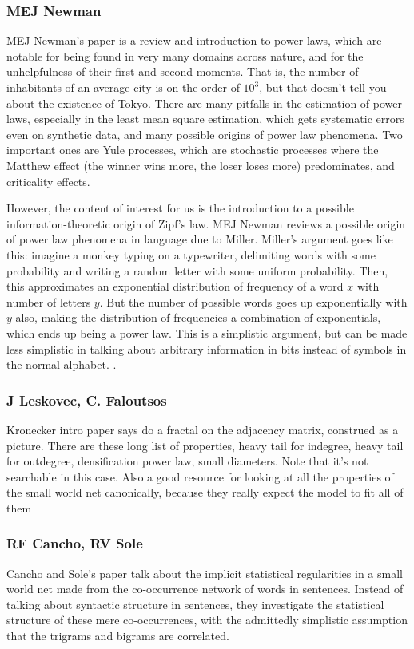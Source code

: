 \documentclass[12pt]{article}
\begin{document}
\subsubsection{MEJ Newman}
MEJ Newman's paper is a review and introduction to power laws, which are notable for being found in very many domains across nature, and for the unhelpfulness of their first and second moments. That is, the number of inhabitants of an average city is on the order of $10^3$, but that doesn't tell you about the existence of Tokyo. There are many pitfalls in the estimation of power laws, especially in the least mean square estimation, which gets systematic errors even on synthetic data, and many possible origins of power law phenomena. Two important ones are Yule processes, which are stochastic processes where the Matthew effect (the winner wins more, the loser loses more) predominates, and criticality effects.

However, the content of interest for us is the introduction to a possible information-theoretic origin of Zipf's law. MEJ Newman reviews a possible origin of power law phenomena in language due to Miller. Miller's argument goes like this: imagine a monkey typing on a typewriter, delimiting words with some probability and writing a random letter with some uniform probability. Then, this approximates an exponential distribution of frequency of a word $x$ with number of letters $y$. But the number of possible words goes up exponentially with $y$ also, making the distribution of frequencies a combination of exponentials, which ends up being a power law. This is a simplistic argument, but can be made less simplistic in talking about arbitrary information in bits instead of symbols in the normal alphabet. %
. 

\subsubsection{J Leskovec, C. Faloutsos}
Kronecker intro paper says do a fractal on the adjacency matrix, construed as a picture. There are these long list of properties, heavy tail for indegree, heavy tail for outdegree, densification power law, small diameters. Note that it's not searchable in this case. Also a good resource for looking at all the properties of the small world net canonically, because they really expect the model to fit all of them

\subsubsection{RF Cancho, RV Sole}
Cancho and Sole's paper talk about the implicit statistical regularities in a small world net made from the co-occurrence network of words in sentences. Instead of talking about syntactic structure in sentences, they investigate the statistical structure of these mere co-occurrences, with the admittedly simplistic assumption that the trigrams and bigrams are correlated.
\end{document}
